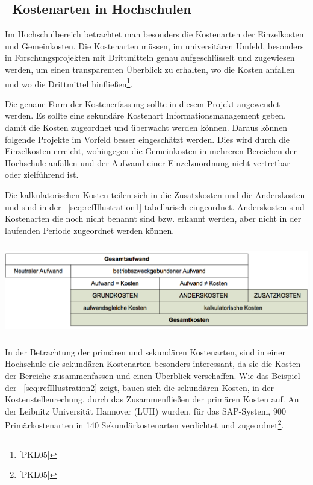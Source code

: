 \documentclass[a4paper]{article}
\makeatletter
\newcommand\captionof[1]{\def\@captype{#1}\caption}
\makeatother
\begin{document}
\subsection[\ Kostenarten in Hochschulen]{\ Kostenarten in Hochschulen}
{\sffamily
Im Hochschulbereich betrachtet man besonders die Kostenarten der Einzelkosten und Gemeinkosten. Die Kostenarten müssen,
im universitären Umfeld, besonders in Forschungsprojekten mit Drittmitteln genau aufgeschlüsselt und zugewiesen werden,
um einen transparenten Überblick zu erhalten, wo die Kosten anfallen und wo die Drittmittel
hinfließen\footnote{[PKL05]}.}


\bigskip

{\sffamily
Die genaue Form der Kostenerfassung sollte in diesem Projekt angewendet werden. Es sollte eine sekundäre Kostenart
Informationsmanagement geben, damit die Kosten zugeordnet und überwacht werden können. Daraus können folgende Projekte
im Vorfeld besser eingeschätzt werden. Dies wird durch die Einzelkosten erreicht, wohingegen die Gemeinkosten in
mehreren Bereichen der Hochschule anfallen und der Aufwand einer Einzelzuordnung nicht vertretbar oder zielführend
ist.}


\bigskip

{\sffamily
Die kalkulatorischen Kosten teilen sich in die Zusatzkosten und die Anderskosten und sind in der
\figurename~\ref{seq:refIllustration1} tabellarisch eingeordnet. Anderskosten sind Kostenarten die noch nicht benannt
sind bzw. erkannt werden, aber nicht in der laufenden Periode zugeordnet werden können. }

{\centering \includegraphics[width=15.455cm,height=3.963cm]{INMAusarbeitung02-img/INMAusarbeitung02-img002.png}
\captionof{figure}[Abgrenzung Aufwand {}- Kosten (Handbuch Kostenartenrechnung 05)]{Abgrenzung Aufwand -
Kosten\textcolor[rgb]{1.0,0.2,0.2}{ (Handbuch Kostenartenrechnung 05}\textcolor{red}{)}}
\label{seq:refIllustration1}
\par}
{\sffamily
In der Betrachtung der primären und sekundären Kostenarten, sind in einer Hochschule die sekundären Kostenarten
besonders interessant, da sie die Kosten der Bereiche zusammenfassen und einen Überblick verschaffen.\newline
Wie das Beispiel der \figurename~\ref{seq:refIllustration2} zeigt, bauen sich die sekundären Kosten, in der
Kostenstellenrechung, durch das Zusammenfließen der primären Kosten auf. An der Leibnitz Universität Hannover (LUH)
wurden, für das SAP-System, 900 Primärkostenarten in 140 Sekundärkostenarten verdichtet und
zugeordnet\footnote{[PKL05]}.}
\end{document}
